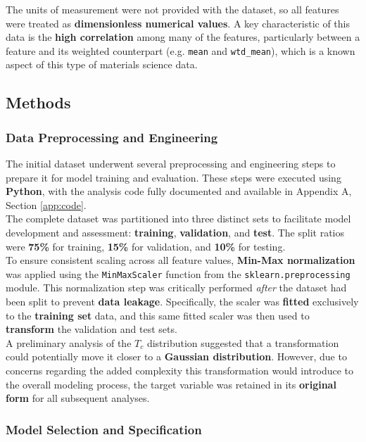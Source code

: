 \documentclass[conference]{IEEEtran}
\begin{document}
The units of measurement were not provided with the dataset, so all features were treated as \textbf{dimensionless numerical values}. A key characteristic of this data is the \textbf{high correlation} among many of the features, particularly between a feature and its weighted counterpart (e.g. \texttt{mean} and \texttt{wtd\_mean}), which is a known aspect of this type of materials science data.

\subsection{\textbf{Methods}}

\subsubsection{\textbf{Data Preprocessing and Engineering}}
The initial dataset underwent several preprocessing and engineering steps to prepare it for model training and evaluation. These steps were executed using \textbf{Python}, with the analysis code fully documented and available in Appendix A, Section \ref{app:code}.\\
\indent The complete dataset was partitioned into three distinct sets to facilitate model development and assessment: \textbf{training}, \textbf{validation}, and \textbf{test}. The split ratios were \textbf{75\%} for training, \textbf{15\%} for validation, and \textbf{10\%} for testing.\\
\indent To ensure consistent scaling across all feature values, \textbf{Min-Max normalization} was applied using the  \texttt{MinMaxScaler} function from the  \texttt{sklearn.preprocessing} module. This normalization step was critically performed \textit{after} the dataset had been split to prevent \textbf{data leakage}. Specifically, the scaler was \textbf{fitted} exclusively to the \textbf{training set} data, and this same fitted scaler was then used to \textbf{transform} the validation and test sets.\\
\indent A preliminary analysis of the $T_c$ distribution suggested that a transformation could potentially move it closer to a \textbf{Gaussian distribution}. However, due to concerns regarding the added complexity this transformation would introduce to the overall modeling process, the target variable was retained in its \textbf{original form} for all subsequent analyses.\\
\subsubsection{\textbf{Model Selection and Specification}}
\end{document}
